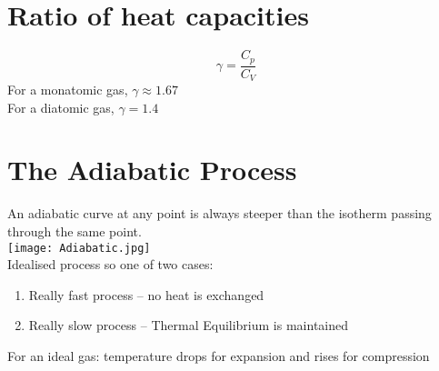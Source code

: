 \documentclass[a4paper, 11pt, fleqn, normalem]{report}
\begin{document}
\section*{Ratio of heat capacities}
\vspace{-22pt}
\begin{equation*}
	\gamma = \frac{C_{p}}{C_{V}}
\end{equation*}
For a monatomic gas, $\gamma \approx 1.67$ \\
For a diatomic gas, $\gamma = 1.4$

\section*{The Adiabatic Process}
An adiabatic curve at any point is always steeper than the isotherm passing through the same point. \\
\texttt{[image: Adiabatic.jpg]} \\
Idealised process so one of two cases:
\vspace{-8pt}
\begin{enumerate}
	\item Really fast process -- no heat is exchanged
	\item Really slow process -- Thermal Equilibrium is maintained
\end{enumerate}
\vspace{-8pt}
For an ideal gas: temperature drops for expansion and rises for compression
\end{document}

